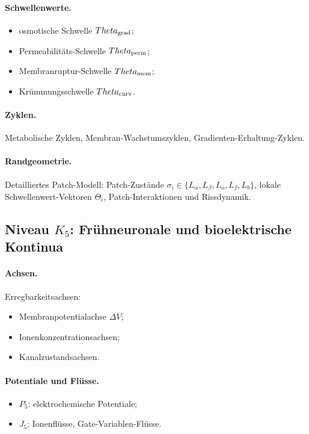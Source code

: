 \paragraph{Schwellenwerte.}
\begin{itemize}
    \item osmotische Schwelle \(\Theta_{\rm grad}\);
    \item Permeabilitäts-Schwelle \(\Theta_{\rm perm}\);
    \item Membranruptur-Schwelle \(\Theta_{\rm mem}\);
    \item Krümmungsschwelle \(\Theta_{\rm curv}\).
\end{itemize}

\paragraph{Zyklen.}
Metabolische Zyklen, Membran-Wachstumszyklen, Gradienten-Erhaltung-Zyklen.

\paragraph{Randgeometrie.}
Detailliertes Patch-Modell:
Patch-Zustände \(\sigma_i\in\{L_\alpha,L_\beta,L_o,L_f,L_b\}\),
lokale Schwellenwert-Vektoren \(\Theta_i\),
Patch-Interaktionen und Rissdynamik.

\subsection{Niveau \texorpdfstring{\texorpdfstring{$K_5$}{K\_5}}{K5}: Frühneuronale und bioelektrische Kontinua}

\paragraph{Achsen.}
Erregbarkeitsachsen:
\begin{itemize}
    \item Membranpotentialachse \(\Delta V\);
    \item Ionenkonzentrationsachsen;
    \item Kanalzustandsachsen.
\end{itemize}

\paragraph{Potentiale und Flüsse.}
\begin{itemize}
    \item \(P_5\): elektrochemische Potentiale;
    \item \(J_5\): Ionenflüsse, Gate-Variablen-Flüsse.
\end{itemize}

